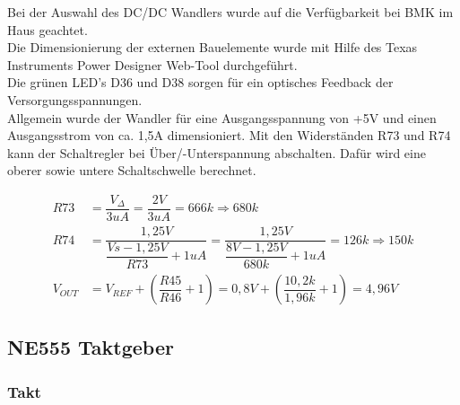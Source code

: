 Bei der Auswahl des DC/DC Wandlers wurde auf die Verfügbarkeit bei BMK im Haus geachtet.
\\
Die Dimensionierung der externen Bauelemente wurde mit Hilfe des \glqq Texas Instruments Power Designer\grqq{} Web-Tool durchgeführt.
\\
Die grünen LED's D36 und D38 sorgen für ein optisches Feedback der Versorgungsspannungen.
\\
Allgemein wurde der Wandler für eine Ausgangsspannung von +5V und einen Ausgangsstrom von ca. 1,5A dimensioniert. Mit den Widerständen R73 und R74 kann der Schaltregler bei Über/-Unterspannung abschalten. Dafür wird eine oberer sowie untere Schaltschwelle berechnet.

\begin{center}
\begin{align}
	R73 &= \dfrac{V_{\Delta}}{3uA} = \dfrac{2V}{3uA} = 666k  \Rightarrow 680k\\
	R74 &= \dfrac{1,25V}{\dfrac{Vs - 1,25V}{R73} + 1uA} = \dfrac{1,25V}{\dfrac{8V - 1,25V}{680k} + 1uA} = 126k \Rightarrow 150k	\\
	V_{OUT}	&= V_{REF} + (\dfrac{R45}{R46} + 1) = 0,8V + (\dfrac{10,2k}{1,96k} + 1) = 4,96V
\end{align}
\end{center}


\newpage


\subsection{NE555 Taktgeber}

\subsubsection{Takt}

